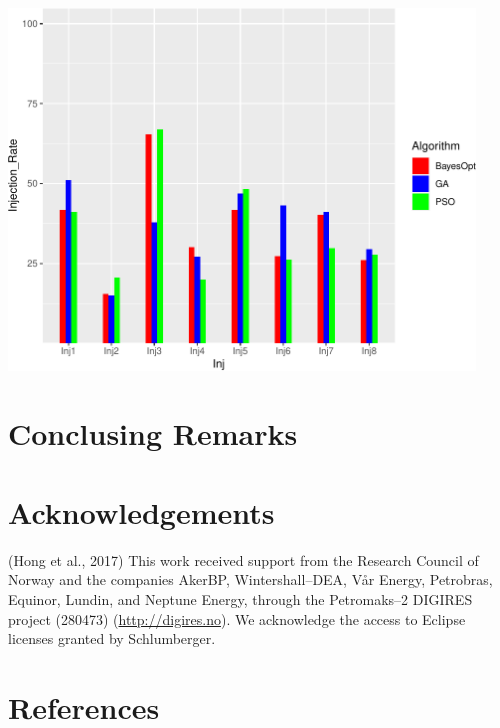 \documentclass[]{elsarticle} %
\begin{document}
\begin{center}\includegraphics[width=468px]{0_Paper1_main_files/figure-latex/unnamed-chunk-11-1} \end{center}

\newpage

\hypertarget{conclusing-remarks}{%
\section{Conclusing Remarks}\label{conclusing-remarks}}

\newpage

\hypertarget{acknowledgements}{%
\section{Acknowledgements}\label{acknowledgements}}

(Hong et al., 2017) This work received support from the Research Council of Norway and the companies AkerBP, Wintershall--DEA, Vår Energy, Petrobras, Equinor, Lundin, and Neptune Energy, through the Petromaks--2 DIGIRES project (280473) (\url{http://digires.no}). We acknowledge the access to Eclipse licenses granted by Schlumberger.

\newpage

\hypertarget{references}{%
\section*{References}\label{references}}
\end{document}
